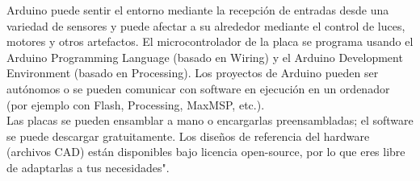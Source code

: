 Arduino puede sentir el entorno mediante la recepción de entradas desde una variedad de sensores y puede afectar a su alrededor mediante el control de luces, motores y otros artefactos. El microcontrolador de la placa se programa usando el Arduino Programming Language (basado en Wiring) y el Arduino Development Environment (basado en Processing). Los proyectos de Arduino pueden ser autónomos o se pueden comunicar con software en ejecución en un ordenador (por ejemplo con Flash, Processing, MaxMSP, etc.).\\

Las placas se pueden ensamblar a mano o encargarlas preensambladas; el software se puede descargar gratuitamente. Los diseños de referencia del hardware (archivos CAD) están disponibles bajo licencia open-source, por lo que eres libre de adaptarlas a tus necesidades".\cite{Ardu}\\